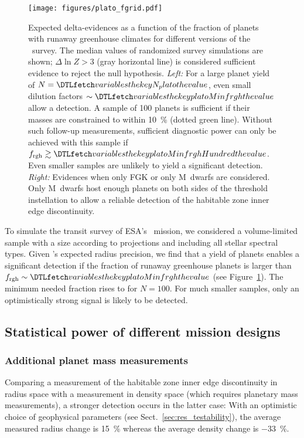 \documentclass[twocolumn,twocolappendix]{aastex631}
\begin{document}
    \begin{figure*}[ht!]
        \begin{centering}
            \texttt{[image: figures/plato\_fgrid.pdf]}
            \caption{
            Expected delta-evidences as a function of the fraction of planets with runaway greenhouse climates for different versions of the \plato\ survey.
            The median values of randomized survey simulations are shown; $\Delta \ln Z > 3$ (gray horizontal line) is considered sufficient evidence to reject the null hypothesis.
            \textit{Left:} For a large planet yield of $N = \var{N_plato}$, even small dilution factors $\sim \var{platoMinfrgh}$ allow a detection.
                A sample of 100 planets is sufficient if their masses are constrained to within \SI{10}{\percent} (dotted green line).
                Without such follow-up measurements, sufficient diagnostic power can only be achieved with this sample if $f_\mathrm{rgh} \gtrsim \var{platoMinfrghHundred}$.
               Even smaller samples are unlikely to yield a significant detection.
            \textit{Right:} Evidences when only FGK or only M~dwarfs are considered.
                Only M~dwarfs host enough planets on both sides of the threshold instellation to allow a reliable detection of the habitable zone inner edge discontinuity.
            }
            \label{fig:plato_fgrid}
        \end{centering}
    \end{figure*}
To simulate the transit survey of ESA's \plato\ mission, we considered a volume-limited sample with a size according to projections and including all stellar spectral types.
Given \plato's expected radius precision, we find that a yield of  planets enables a significant detection if the fraction of runaway greenhouse planets is larger than $ f_\mathrm{rgh} \sim \var{platoMinfrgh}$ (see Figure~\ref{fig:plato_fgrid}).
The minimum needed fraction rises to  for $N = 100$.
For much smaller samples, only an optimistically strong signal is likely to be detected.


\subsection{Statistical power of different mission designs}\label{sec:statpower_missions}

\subsubsection{Additional planet mass measurements}\label{sec:res_followup}
Comparing a measurement of the habitable zone inner edge discontinuity in radius space with a measurement in density space (which requires planetary mass measurements), a stronger detection occurs in the latter case:
With an optimistic choice of geophysical parameters (see Sect.~\ref{sec:res_testability}), the average measured radius change is \SI{+15}{\percent} whereas the average density change is \SI{-33}{\percent}.
\end{document}
